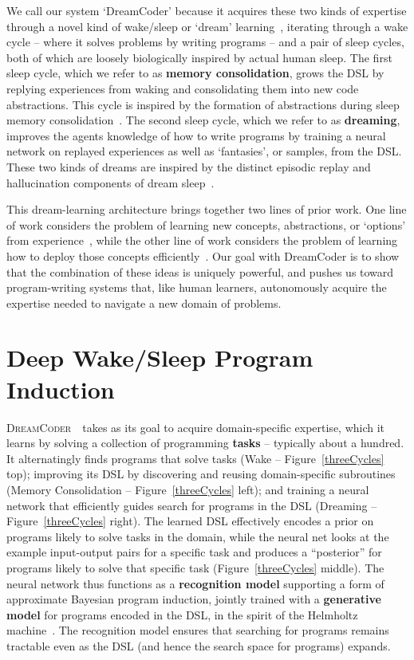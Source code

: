 \documentclass{article}
\newcommand{\system}{\textsc{DreamCoder}~}
\begin{document}
We call our system `DreamCoder' because it acquires these two kinds of
expertise through a novel kind of wake/sleep or `dream'
learning~\cite{hinton1995wake}, iterating through a wake cycle --
where it solves problems by writing programs -- and a pair of sleep
cycles, both of which are loosely biologically inspired by actual
human sleep.  The first sleep cycle, which we refer to as
\textbf{memory consolidation}, grows the DSL by replying experiences
from waking and consolidating them into new code abstractions.  This
cycle is inspired by the formation of abstractions during sleep memory
consolidation~\cite{DUDAI201520}.  The second sleep cycle, which we
refer to as \textbf{dreaming}, improves the agents knowledge of how to
write programs by training a neural network on replayed experiences as
well as `fantasies', or samples, from the DSL.  These two kinds of
dreams are inspired by the distinct episodic replay and hallucination
components of dream sleep~\cite{fosse2003dreaming}.

This dream-learning architecture brings together two lines of prior work.
One line of work
considers the problem of learning new concepts, abstractions, or
`options' from
experience~\cite{Dechter:2013:BLV:2540128.2540316,DBLP:conf/icml/LiangJK10,solomonoff1989system,DBLP:journals/corr/abs-1110-5667,stolle2002learning},
while the other line of work considers the problem of learning how to
deploy those concepts
efficiently~\cite{devlin2017robustfill,balog2016deepcoder,NGDS}.  Our
goal with DreamCoder is to show that the combination of these ideas is
uniquely powerful, and pushes us toward program-writing systems that,
like human learners, autonomously acquire the expertise needed to
navigate a new domain of problems.

\section{Deep Wake/Sleep Program Induction}

\system~takes as its goal to acquire domain-specific expertise, which
it learns by solving a collection of programming \textbf{tasks} --
typically about a hundred.  It alternatingly finds programs that solve
tasks (Wake -- Figure~\ref{threeCycles} top); improving its DSL by
discovering and reusing domain-specific subroutines (Memory
Consolidation -- Figure~\ref{threeCycles} left); and training a neural
network that efficiently guides search for programs in the DSL
(Dreaming -- Figure~\ref{threeCycles} right).  The learned DSL
effectively encodes a prior on programs likely to solve tasks in the
domain, while the neural net looks at the example input-output pairs
for a specific task and produces a ``posterior'' for programs likely
to solve that specific task (Figure~\ref{threeCycles} middle).  The
neural network thus functions as a \textbf{recognition model}
supporting a form of approximate Bayesian program induction, jointly
trained with a \textbf{generative model} for programs encoded in the
DSL, in the spirit of the Helmholtz machine~\cite{hinton1995wake}. The
recognition model ensures that searching for programs remains
tractable even as the DSL (and hence the search space for programs)
expands.
\end{document}
